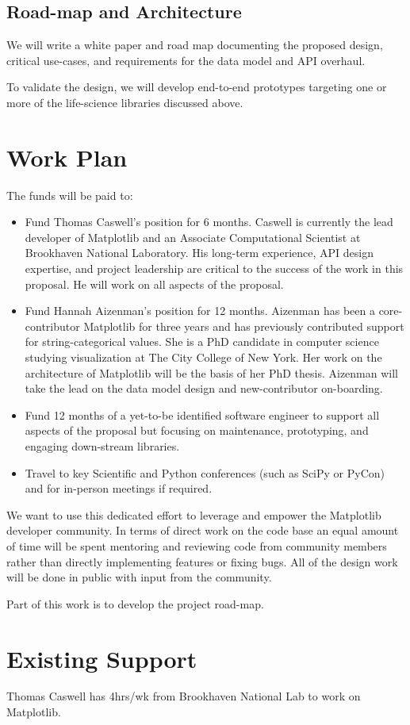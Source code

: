 \documentclass[11pt]{article}  %
\begin{document}
\subsection{Road-map and Architecture}

We will write a white paper and road map documenting the proposed
design, critical use-cases, and requirements for the data model and
API overhaul.

To validate the design, we will develop end-to-end prototypes
targeting one or more of the life-science libraries discussed above.



\section{Work Plan}

The funds will be paid to:


\begin{itemize}[noitemsep]

\item Fund Thomas Caswell's position for 6 months.  Caswell is
  currently the lead developer of Matplotlib and an Associate
  Computational Scientist at Brookhaven National Laboratory.  His
  long-term experience, API design expertise, and project leadership
  are critical to the success of the work in this proposal.  He will work
  on all aspects of the proposal.
\item Fund Hannah Aizenman's position for 12 months.  Aizenman has
  been a core-contributor Matplotlib for three years and has
  previously contributed support for string-categorical values.  She
  is a PhD candidate in computer science studying visualization at The
  City College of New York.  Her work on the architecture of
  Matplotlib will be the basis of her PhD thesis.  Aizenman will take
  the lead on the data model design and new-contributor on-boarding.
\item Fund 12 months of a yet-to-be identified software engineer to
  support all aspects of the proposal but focusing on maintenance,
  prototyping, and engaging down-stream libraries.
\item Travel to key Scientific and Python conferences (such as SciPy
  or PyCon) and for in-person meetings if required.
\end{itemize}

We want to use this dedicated effort to leverage and empower the
Matplotlib developer community.  In terms of direct work on the code
base an equal amount of time will be spent mentoring and reviewing
code from community members rather than directly implementing features
or fixing bugs.  All of the design work will be done in public with
input from the community.

Part of this work is to develop the project road-map.


\section{Existing Support}

Thomas Caswell has 4hrs/wk from Brookhaven National Lab to work on
Matplotlib.


\clearpage

\end{document}
